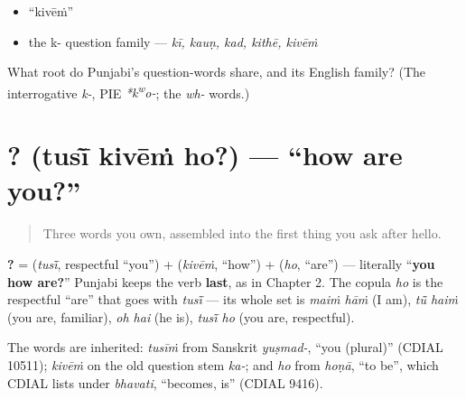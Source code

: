 \begin{itemize}
\raggedright
  \item \textquotedblleft{}kivēṁ\textquotedblright{}
  \item the k- question family — \emph{kī, kauṇ, kad, kithē, kivēṁ}
\end{itemize}

\begin{tcolorbox}[breakable,colback=teal!4,colframe=teal!35!black,title={Before you move on}]
What root do Punjabi's question-words share, and its English family? (The interrogative \emph{k-}, PIE \emph{*k\textsuperscript{w}o-}; the \emph{wh-} words.)
\end{tcolorbox}
\section[\texorpdfstring{\pa{ਤੁਸੀਂ} \pa{ਕਿਵੇਂ} \pa{ਹੋ}? (tusī̃ kivēṁ ho?)}{ਤੁਸੀਂ ਕਿਵੇਂ ਹੋ? (tusī̃ kivēṁ ho?)}]{  ? (tusī̃ kivēṁ ho?) — \textquotedblleft{}how are you?\textquotedblright{}}

\label{lesson:PA-C03-tusi-kivein-ho}



\begin{quote}
Three words you own, assembled into the first thing you ask after hello.
\end{quote}

\begin{cousinweb}
\textbf{  ?} = \textbf{} (\emph{tusī̃}, respectful \textquotedblleft{}you\textquotedblright{}) + \textbf{} (\emph{kivēṁ}, \textquotedblleft{}how\textquotedblright{}) + \textbf{} (\emph{ho}, \textquotedblleft{}are\textquotedblright{}) — literally \textquotedblleft{}\textbf{you how are?}\textquotedblright{} Punjabi keeps the verb \textbf{last}, as in Chapter 2. The copula \emph{ho} is the respectful \textquotedblleft{}are\textquotedblright{} that goes with \emph{tusī̃} — its whole set is \emph{maiṁ hāṁ} (I am), \emph{tū̃ haiṁ} (you are, familiar), \emph{oh hai} (he is), \emph{tusī̃ ho} (you are, respectful).

The words are inherited: \emph{tusīṁ} from Sanskrit \emph{yuṣmad-}, \textquotedblleft{}you (plural)\textquotedblright{} (CDIAL 10511); \emph{kivēṁ} on the old question stem \emph{ka-}; and \emph{ho} from \emph{hoṇā}, \textquotedblleft{}to be\textquotedblright{}, which CDIAL lists under \emph{bhavati}, \textquotedblleft{}becomes, is\textquotedblright{} (CDIAL 9416).
\end{cousinweb}

